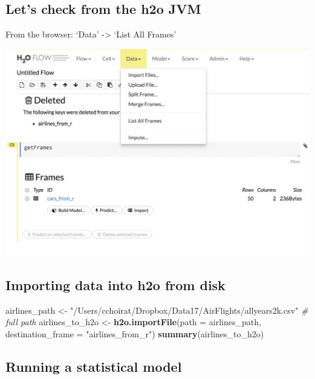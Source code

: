 \documentclass[]{book}
\newenvironment{Shaded}{\begin{snugshade}}{\end{snugshade}}
\newcommand{\KeywordTok}[1]{\textcolor[rgb]{0.13,0.29,0.53}{\textbf{#1}}}
\newcommand{\DataTypeTok}[1]{\textcolor[rgb]{0.13,0.29,0.53}{#1}}
\newcommand{\StringTok}[1]{\textcolor[rgb]{0.31,0.60,0.02}{#1}}
\newcommand{\CommentTok}[1]{\textcolor[rgb]{0.56,0.35,0.01}{\textit{#1}}}
\newcommand{\NormalTok}[1]{#1}
\theoremstyle{definition}
\theoremstyle{definition}
\theoremstyle{definition}
\theoremstyle{remark}
\begin{document}
\subsection{Let's check from the h2o
JVM}\label{lets-check-from-the-h2o-jvm}

From the browser: `Data' -\textgreater{} `List All Frames'

\begin{center}\includegraphics[width=28.42in]{images/ch6_h2o_list_data} \end{center}

\subsection{Importing data into h2o from
disk}\label{importing-data-into-h2o-from-disk}

\begin{Shaded}
\begin{Highlighting}[]
\NormalTok{airlines_path <-}\StringTok{ "/Users/cchoirat/Dropbox/Data17/AirFlights/allyears2k.csv"} \CommentTok{# full path}
\NormalTok{airlines_to_h2o <-}\StringTok{ }\KeywordTok{h2o.importFile}\NormalTok{(}\DataTypeTok{path =}\NormalTok{ airlines_path,}
                                  \DataTypeTok{destination_frame =} \StringTok{"airlines_from_r"}\NormalTok{)}
\KeywordTok{summary}\NormalTok{(airlines_to_h2o)}
\end{Highlighting}
\end{Shaded}

\subsection{Running a statistical
model}\label{running-a-statistical-model}
\end{document}

